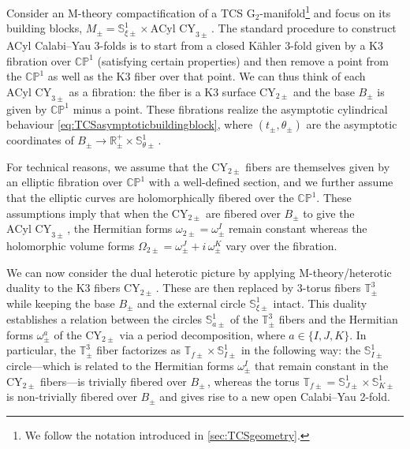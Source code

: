 \documentclass{pspum-l}
\newcommand*\Sc{\mathbb{S}}
\newcommand*\R{\mathbb{R}}
\theoremstyle{definition}
\theoremstyle{remark}
\numberwithin{equation}{section}
\begin{document}
Consider an M-theory compactification of a TCS G$_2$-manifold\footnote{We follow the notation introduced in \cref{sec:TCSgeometry}.} and focus on its building blocks, $M_\pm=\Sc^1_{\xi\pm}\times\text{ACyl CY}_{3\pm}\,$. The standard procedure to construct ACyl Calabi--Yau 3-folds \cite{Corti:2012, Corti:2012kd} is to start from a closed K\"ahler 3-fold given by a K3 fibration over $\mathbb{CP}^1$ (satisfying certain properties) and then remove a point from the $\mathbb{CP}^1$ as well as the K3 fiber over that point. We can thus think of each $\text{ACyl CY}_{3\pm}$ as a fibration: the fiber is a K3 surface $\text{CY}_{2\pm}$ and the base $B_\pm$ is given by $\mathbb{CP}^1$ minus a point. These fibrations realize the asymptotic cylindrical behaviour \eqref{eq:TCSasymptoticbuildingblock}, where $(t_\pm,\theta_\pm)$ are the asymptotic coordinates of $B_\pm\longrightarrow\R^+_\pm\times\Sc^1_{\theta\pm}\,$.

For technical reasons, we assume that the $\text{CY}_{2\pm}$ fibers are themselves given by an elliptic fibration over $\mathbb{CP}^1$ with a well-defined section, and we further assume that the elliptic curves are holomorphically fibered over the $\mathbb{CP}^1$. These assumptions imply that when the $\text{CY}_{2\pm}$ are fibered over $B_\pm$ to give the $\text{ACyl CY}_{3\pm}\,$, the Hermitian forms $\omega_{2\pm}=\omega^I_{\pm}$ remain constant whereas the holomorphic volume forms $\Omega_{2\pm}=\omega^J_{\pm}+i\,\omega^K_{\pm}$ vary over the fibration.

We can now consider the dual heterotic picture by applying M-theory/heterotic duality to the K3 fibers $\text{CY}_{2\pm}\,$. These are then replaced by 3-torus fibers $\mathbb{T}^3_\pm$ while keeping the base $B_\pm$ and the external circle $\Sc^1_{\xi\pm}$ intact. This duality establishes a relation between the circles $\Sc^1_{a\pm}$ of the $\mathbb{T}^3_\pm$ fibers and the Hermitian forms $\omega^a_\pm$ of the $\text{CY}_{2\pm}$ via a period decomposition, where $a\in\lbrace I,J,K\rbrace$. In particular, the $\mathbb{T}^3_\pm$ fiber factorizes as $\mathbb{T}_{f\pm}\times \Sc^1_{I\pm}$ in the following way: the $\Sc^1_{I\pm}$ circle---which is related to the Hermitian forms $\omega^I_{\pm}$ that remain constant in the $\text{CY}_{2\pm}$ fibers---is trivially fibered over $B_\pm\,$, whereas the torus $\mathbb{T}_{f\pm}=\Sc^1_{J\pm}\times\Sc^1_{K\pm}$ is non-trivially fibered over $B_\pm$ and gives rise to a new open Calabi--Yau 2-fold.
\end{document}
